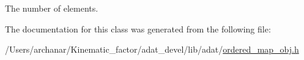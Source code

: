 The number of elements. 



The documentation for this class was generated from the following file\+:\begin{DoxyCompactItemize}
\item 
/\+Users/archanar/\+Kinematic\+\_\+factor/adat\+\_\+devel/lib/adat/\mbox{\hyperlink{ordered__map__obj_8h}{ordered\+\_\+map\+\_\+obj.\+h}}\end{DoxyCompactItemize}
